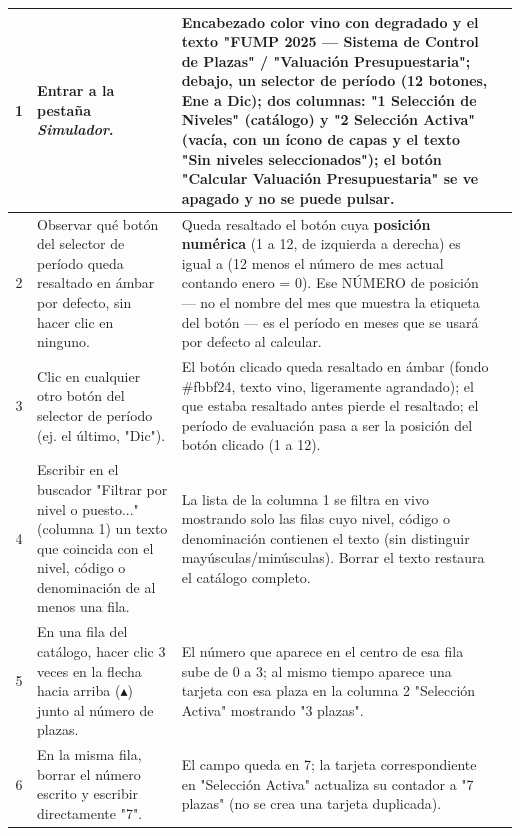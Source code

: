 \documentclass[11pt]{article}
\newcommand{\chk}[1]{\CheckBox[name=#1,width=11pt,height=11pt,bordercolor=grisborde,backgroundcolor=1 1 1]{}}
\begin{document}
\begin{Form}
\begin{longtable}{|c|p{6.7cm}|p{6.7cm}|c|}
1 &
Entrar a la pestaña \emph{Simulador}. &
Encabezado color vino con degradado y el texto "FUMP 2025 --- Sistema de Control de Plazas" /
"Valuación Presupuestaria"; debajo, un selector de período (12 botones, Ene a Dic); dos columnas:
"1 Selección de Niveles" (catálogo) y "2 Selección Activa" (vacía, con un ícono de capas y el texto
"Sin niveles seleccionados"); el botón "Calcular Valuación Presupuestaria" se ve apagado y no se
puede pulsar. &
\chk{t1r1} \\ \hline

2 &
Observar qué botón del selector de período queda resaltado en ámbar por defecto, sin hacer clic
en ninguno. &
Queda resaltado el botón cuya \textbf{posición numérica} (1 a 12, de izquierda a derecha) es igual
a (12 menos el número de mes actual contando enero = 0). Ese NÚMERO de posición --- no el nombre
del mes que muestra la etiqueta del botón --- es el período en meses que se usará por defecto al
calcular. &
\chk{t1r2} \\ \hline

3 &
Clic en cualquier otro botón del selector de período (ej. el último, "Dic"). &
El botón clicado queda resaltado en ámbar (fondo \#fbbf24, texto vino, ligeramente agrandado); el
que estaba resaltado antes pierde el resaltado; el período de evaluación pasa a ser la posición del
botón clicado (1 a 12). &
\chk{t1r3} \\ \hline

4 &
Escribir en el buscador "Filtrar por nivel o puesto..." (columna 1) un texto que coincida con el
nivel, código o denominación de al menos una fila. &
La lista de la columna 1 se filtra en vivo mostrando solo las filas cuyo nivel, código o
denominación contienen el texto (sin distinguir mayúsculas/minúsculas). Borrar el texto restaura
el catálogo completo. &
\chk{t1r4} \\ \hline

5 &
En una fila del catálogo, hacer clic 3 veces en la flecha hacia arriba ($\blacktriangle$) junto al
número de plazas. &
El número que aparece en el centro de esa fila sube de 0 a 3; al mismo tiempo aparece una tarjeta
con esa plaza en la columna 2 "Selección Activa" mostrando "3 plazas". &
\chk{t1r5} \\ \hline

6 &
En la misma fila, borrar el número escrito y escribir directamente "7". &
El campo queda en 7; la tarjeta correspondiente en "Selección Activa" actualiza su contador a
"7 plazas" (no se crea una tarjeta duplicada). &
\chk{t1r6} \\ \hline


\end{longtable}
\end{Form}
\end{document}
